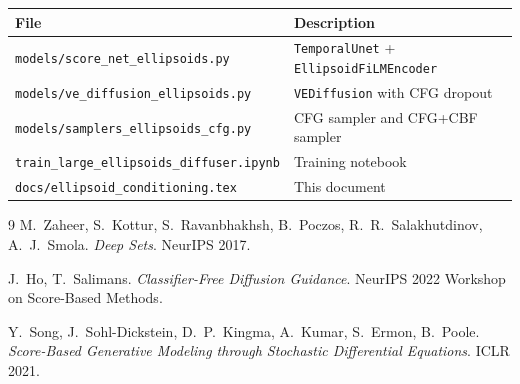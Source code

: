 \documentclass{article}
\begin{document}
\begin{center}
\begin{tabular}{ll}
\toprule
\textbf{File} & \textbf{Description} \\
\midrule
\texttt{models/score\_net\_ellipsoids.py}     & \texttt{TemporalUnet} + \texttt{EllipsoidFiLMEncoder} \\
\texttt{models/ve\_diffusion\_ellipsoids.py}  & \texttt{VEDiffusion} with CFG dropout \\
\texttt{models/samplers\_ellipsoids\_cfg.py}  & CFG sampler and CFG+CBF sampler \\
\texttt{train\_large\_ellipsoids\_diffuser.ipynb} & Training notebook \\
\texttt{docs/ellipsoid\_conditioning.tex}     & This document \\
\bottomrule
\end{tabular}
\end{center}

\begin{thebibliography}{9}
    M.\ Zaheer, S.\ Kottur, S.\ Ravanbhakhsh, B.\ Poczos, R.\ R.\ Salakhutdinov, A.\ J.\ Smola.
    \emph{Deep Sets}.
    NeurIPS 2017.

    J.\ Ho, T.\ Salimans.
    \emph{Classifier-Free Diffusion Guidance}.
    NeurIPS 2022 Workshop on Score-Based Methods.

    Y.\ Song, J.\ Sohl-Dickstein, D.\ P.\ Kingma, A.\ Kumar, S.\ Ermon, B.\ Poole.
    \emph{Score-Based Generative Modeling through Stochastic Differential Equations}.
    ICLR 2021.
\end{thebibliography}
\end{document}
